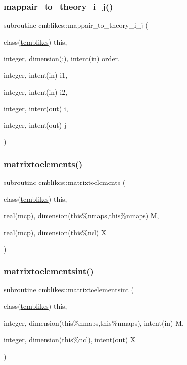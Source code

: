 \subsubsection{\texorpdfstring{mappair\+\_\+to\+\_\+theory\+\_\+i\+\_\+j()}{mappair\_to\_theory\_i\_j()}}
{\footnotesize\ttfamily subroutine cmblikes\+::mappair\+\_\+to\+\_\+theory\+\_\+i\+\_\+j (\begin{DoxyParamCaption}\item[{class(\mbox{\hyperlink{structcmblikes_1_1tcmblikes}{tcmblikes}})}]{this,  }\item[{integer, dimension(\+:), intent(in)}]{order,  }\item[{integer, intent(in)}]{i1,  }\item[{integer, intent(in)}]{i2,  }\item[{integer, intent(out)}]{i,  }\item[{integer, intent(out)}]{j }\end{DoxyParamCaption})\hspace{0.3cm}{\ttfamily [private]}}

\mbox{\label{namespacecmblikes_a16be2c18f3fecf43964ef1f2995dcd4e}} 
\subsubsection{\texorpdfstring{matrixtoelements()}{matrixtoelements()}}
{\footnotesize\ttfamily subroutine cmblikes\+::matrixtoelements (\begin{DoxyParamCaption}\item[{class(\mbox{\hyperlink{structcmblikes_1_1tcmblikes}{tcmblikes}})}]{this,  }\item[{real(mcp), dimension(this\%nmaps,this\%nmaps)}]{M,  }\item[{real(mcp), dimension(this\%ncl)}]{X }\end{DoxyParamCaption})\hspace{0.3cm}{\ttfamily [private]}}

\mbox{\label{namespacecmblikes_a908a9bb9c69b1ef3a8b7df6519fd4641}} 
\subsubsection{\texorpdfstring{matrixtoelementsint()}{matrixtoelementsint()}}
{\footnotesize\ttfamily subroutine cmblikes\+::matrixtoelementsint (\begin{DoxyParamCaption}\item[{class(\mbox{\hyperlink{structcmblikes_1_1tcmblikes}{tcmblikes}})}]{this,  }\item[{integer, dimension(this\%nmaps,this\%nmaps), intent(in)}]{M,  }\item[{integer, dimension(this\%ncl), intent(out)}]{X }\end{DoxyParamCaption})\hspace{0.3cm}{\ttfamily [private]}}

